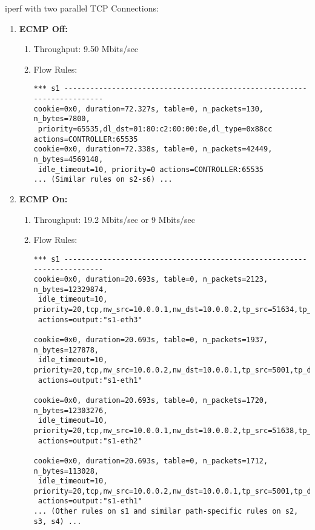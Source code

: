 \documentclass[12pt]{article}
\begin{document}
\noindent iperf with two parallel TCP Connections:
\begin{enumerate}
    \item \textbf{ECMP Off:}
    \begin{enumerate}
        \item Throughput: 9.50 Mbits/sec
        \item Flow Rules:
        \begin{verbatim}
*** s1 ------------------------------------------------------------------------
cookie=0x0, duration=72.327s, table=0, n_packets=130, n_bytes=7800, 
 priority=65535,dl_dst=01:80:c2:00:00:0e,dl_type=0x88cc actions=CONTROLLER:65535
cookie=0x0, duration=72.338s, table=0, n_packets=42449, n_bytes=4569148, 
 idle_timeout=10, priority=0 actions=CONTROLLER:65535
... (Similar rules on s2-s6) ...
        \end{verbatim}
    \end{enumerate}
    \item \textbf{ECMP On:}
    \begin{enumerate}
        \item Throughput: 19.2 Mbits/sec or 9 Mbits/sec
        \item Flow Rules:
        \begin{verbatim}
*** s1 ------------------------------------------------------------------------
cookie=0x0, duration=20.693s, table=0, n_packets=2123, n_bytes=12329874, 
 idle_timeout=10, priority=20,tcp,nw_src=10.0.0.1,nw_dst=10.0.0.2,tp_src=51634,tp_dst=5001 
 actions=output:"s1-eth3"

cookie=0x0, duration=20.693s, table=0, n_packets=1937, n_bytes=127878, 
 idle_timeout=10, priority=20,tcp,nw_src=10.0.0.2,nw_dst=10.0.0.1,tp_src=5001,tp_dst=51634 
 actions=output:"s1-eth1"

cookie=0x0, duration=20.693s, table=0, n_packets=1720, n_bytes=12303276, 
 idle_timeout=10, priority=20,tcp,nw_src=10.0.0.1,nw_dst=10.0.0.2,tp_src=51638,tp_dst=5001 
 actions=output:"s1-eth2"

cookie=0x0, duration=20.693s, table=0, n_packets=1712, n_bytes=113028, 
 idle_timeout=10, priority=20,tcp,nw_src=10.0.0.2,nw_dst=10.0.0.1,tp_src=5001,tp_dst=51638 
 actions=output:"s1-eth1"
... (Other rules on s1 and similar path-specific rules on s2, s3, s4) ...
        \end{verbatim}
    \end{enumerate}
\end{enumerate}
\end{document}
